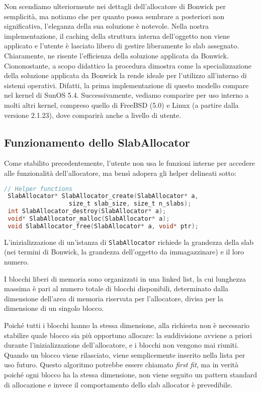Non scendiamo ulteriormente nei dettagli dell’allocatore di Bonwick per semplicità, ma notiamo che per quanto possa sembrare a posteriori non significativa, l’eleganza della sua soluzione è notevole. Nella nostra implementazione, il caching della struttura interna dell’oggetto non viene applicato e l’utente è lasciato libero di gestire liberamente lo slab assegnato. Chiaramente, ne risente l’efficienza della soluzione applicata da Bonwick. Ciononostante, a scopo didattico la procedura dimostra come la specializzazione della soluzione applicata da Bonwick la rende ideale per l’utilizzo all’interno di sistemi operativi. Difatti, la prima implementazione di questo modello compare nel kernel di SunOS 5.4. Successivamente, vediamo comparire per uso interno a molti altri kernel, compreso quello di FreeBSD (5.0) e Linux (a partire dalla versione 2.1.23), dove comparirà anche a livello di utente.

\subsection{Funzionamento dello SlabAllocator}

Come stabilito precedentemente, l’utente non usa le funzioni interne per accedere alle funzionalità dell’allocatore, ma bensì adopera gli helper delineati sotto:

\begin{lstlisting}[language=C, caption={Helper functions per SlabAllocator}, breaklines=true]
 // Helper functions
 SlabAllocator* SlabAllocator_create(SlabAllocator* a, 
                  size_t slab_size, size_t n_slabs);
 int SlabAllocator_destroy(SlabAllocator* a);
 void* SlabAllocator_malloc(SlabAllocator* a);
 void SlabAllocator_free(SlabAllocator* a, void* ptr);
\end{lstlisting}

L’inizializzazione di un'istanza di \texttt{SlabAllocator} richiede la grandezza della slab (nei termini di Bonwick, la grandezza dell’oggetto da immagazzinare) e il loro numero.

I blocchi liberi di memoria sono organizzati in una linked list, la cui lunghezza massima è pari al numero totale di blocchi disponibili, determinato dalla dimensione dell’area di memoria riservata per l’allocatore, divisa per la dimensione di un singolo blocco.

Poiché tutti i blocchi hanno la stessa dimensione, alla richiesta non è necessario stabilire quale blocco sia più opportuno allocare: la suddivisione avviene a priori durante l’inizializzazione dell’allocatore, e i blocchi non vengono mai riuniti. Quando un blocco viene rilasciato, viene semplicemente inserito nella lista per uso futuro. Questo algoritmo potrebbe essere chiamato \textit{first fit}, ma in verità poiché ogni blocco ha la stessa dimensione, non viene seguito un pattern standard di allocazione e invece il comportamento dello slab allocator è prevedibile.

